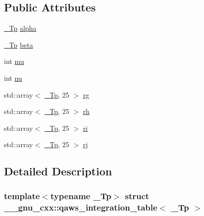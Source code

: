 \subsection*{Public Attributes}
\begin{DoxyCompactItemize}
\item 
\hyperlink{namespace____gnu__cxx_a3b19a9c800ca194374ef9172290f7d79}{\+\_\+\+Tp} \hyperlink{struct____gnu__cxx_1_1qaws__integration__table_a22b7131c633fe090ec1055d51b486bc0}{alpha}
\item 
\hyperlink{namespace____gnu__cxx_a3b19a9c800ca194374ef9172290f7d79}{\+\_\+\+Tp} \hyperlink{struct____gnu__cxx_1_1qaws__integration__table_ad7cdd51af800d8830907d0718035753c}{beta}
\item 
int \hyperlink{struct____gnu__cxx_1_1qaws__integration__table_a27e7db2fb032dc33759509c9c55546dc}{mu}
\item 
int \hyperlink{struct____gnu__cxx_1_1qaws__integration__table_acc78257f8dffad045fe66a13b9c7c434}{nu}
\item 
std\+::array$<$ \hyperlink{namespace____gnu__cxx_a3b19a9c800ca194374ef9172290f7d79}{\+\_\+\+Tp}, 25 $>$ \hyperlink{struct____gnu__cxx_1_1qaws__integration__table_a6549e81e45d5c4196301c945f707f221}{rg}
\item 
std\+::array$<$ \hyperlink{namespace____gnu__cxx_a3b19a9c800ca194374ef9172290f7d79}{\+\_\+\+Tp}, 25 $>$ \hyperlink{struct____gnu__cxx_1_1qaws__integration__table_a7b954bd038be5e62ade0abf9283e90af}{rh}
\item 
std\+::array$<$ \hyperlink{namespace____gnu__cxx_a3b19a9c800ca194374ef9172290f7d79}{\+\_\+\+Tp}, 25 $>$ \hyperlink{struct____gnu__cxx_1_1qaws__integration__table_aa38340ca8677164ecd511a35d5d2a8e7}{ri}
\item 
std\+::array$<$ \hyperlink{namespace____gnu__cxx_a3b19a9c800ca194374ef9172290f7d79}{\+\_\+\+Tp}, 25 $>$ \hyperlink{struct____gnu__cxx_1_1qaws__integration__table_a1b6aa4c79cb8c470510cabc5a502327c}{rj}
\end{DoxyCompactItemize}


\subsection{Detailed Description}
\subsubsection*{template$<$typename \+\_\+\+Tp$>$\newline
struct \+\_\+\+\_\+gnu\+\_\+cxx\+::qaws\+\_\+integration\+\_\+table$<$ \+\_\+\+Tp $>$}

